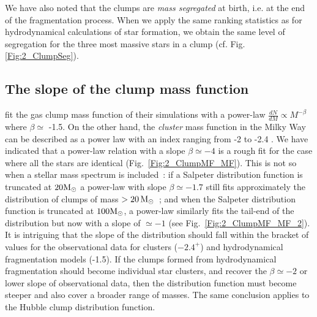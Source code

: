 We have also noted that the clumps are {\it mass segregated} at birth, i.e. at the end of the fragmentation process. When we apply the same ranking statistics as for hydrodynamical calculations of star formation, we obtain the same level of segregation for the three most massive stars in a clump (cf. Fig. \ref{Fig:2_ClumpSeg}). %

\subsection*{The slope of the clump mass function}

\cite{Klessen2000,Klessen2001} fit the gas clump mass function of their simulations with a power-law $\frac{dN}{dM} \propto M^{-\beta}$ where $\beta \simeq$ -1.5. On the other hand, the \textit{cluster} mass function in the Milky Way can be described as a power law with an index ranging from -2 to -2.4 \citep{Haas2010}. We have indicated that a power-law relation with a slope $ \beta \simeq -4$ is a rough fit for the case where all the stars are identical (Fig.~\ref{Fig:2_ClumpMF_MF}). This is not so  when a stellar mass spectrum is included~: if a Salpeter distribution function is truncated at $20 {\textrm{M}_\odot}$ a power-law with slope $ \beta \simeq -1.7$ still fits approximately the distribution of clumps of  mass $ > 20\, {\textrm{M}_\odot}$~; and when the Salpeter distribution function is truncated at $100 {\textrm{M}_\odot}$, a power-law similarly fits the tail-end of the distribution but now with a slope of $\simeq -1$ (see Fig.~\ref{Fig:2_ClumpMF_MF_2}). It is intriguing that the slope of the distribution should fall within the bracket of values for the observational data for clusters ($-2.4^+$) and hydrodynamical fragmentation models (-1.5). If the clumps formed from hydrodynamical fragmentation should become individual star clusters, and recover the $\beta \simeq -2 $ or lower slope of observational data, then the distribution function must become steeper and also cover a broader range of masses. The same conclusion applies to the Hubble clump distribution function.

